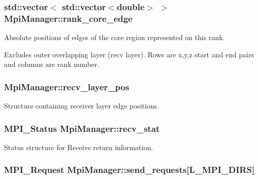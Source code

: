 \subsubsection[{\texorpdfstring{rank\+\_\+core\+\_\+edge}{rank_core_edge}}]{\setlength{\rightskip}{0pt plus 5cm}std\+::vector$<$ std\+::vector$<$double$>$ $>$ Mpi\+Manager\+::rank\+\_\+core\+\_\+edge}\hypertarget{class_mpi_manager_a0211cd784c9ed1514d5968599e794313}{}\label{class_mpi_manager_a0211cd784c9ed1514d5968599e794313}


Absolute positions of edges of the core region represented on this rank. 

Excludes outer overlapping layer (recv layer). Rows are x,y,z start and end pairs and columns are rank number. 
\subsubsection[{\texorpdfstring{recv\+\_\+layer\+\_\+pos}{recv_layer_pos}}]{ Mpi\+Manager\+::recv\+\_\+layer\+\_\+pos}\hypertarget{class_mpi_manager_ad1ff57a97ec56efc1690dd3a5a52fd64}{}\label{class_mpi_manager_ad1ff57a97ec56efc1690dd3a5a52fd64}


Structure containing receiver layer edge positions. 

\subsubsection[{\texorpdfstring{recv\+\_\+stat}{recv_stat}}]{\setlength{\rightskip}{0pt plus 5cm}M\+P\+I\+\_\+\+Status Mpi\+Manager\+::recv\+\_\+stat}\hypertarget{class_mpi_manager_a257bc27e8099f1cbf5ac70b80d8eadaa}{}\label{class_mpi_manager_a257bc27e8099f1cbf5ac70b80d8eadaa}


Status structure for Receive return information. 

\subsubsection[{\texorpdfstring{send\+\_\+requests}{send_requests}}]{\setlength{\rightskip}{0pt plus 5cm}M\+P\+I\+\_\+\+Request Mpi\+Manager\+::send\+\_\+requests\mbox{[}{\bf L\+\_\+\+M\+P\+I\+\_\+\+D\+I\+RS}\mbox{]}}\hypertarget{class_mpi_manager_ae4ba6735840e949dff5cd63ab1695ff0}{}\label{class_mpi_manager_ae4ba6735840e949dff5cd63ab1695ff0}


